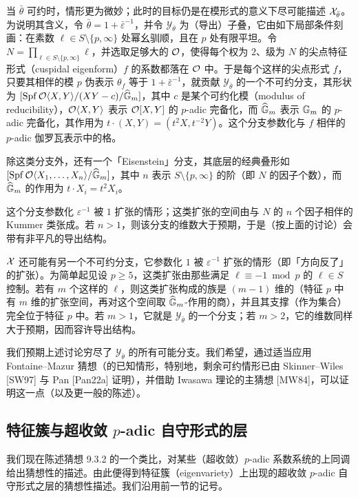 当 $\bar\theta$ 可约时，情形更为微妙；此时的目标仍是在模形式的意义下尽可能描述 $\mathcal{X}_{\bar\theta}$。为说明其含义，令 $\bar\theta=1+\bar\varepsilon^{-1}$，并令 $\mathcal Y_{\bar\theta}$ 为（导出）子叠，它由如下局部条件刻画：在素数 $\ell\in S\setminus\{p,\infty\}$ 处幂幺驯顺，且在 $p$ 处有限平坦。令 $N=\prod\limits_{\ell\in S\setminus\{p,\infty\}}\ell$，并选取足够大的 $\mathcal{O}$，使得每个权为 $2$、级为 $N$ 的尖点特征形式（cuspidal eigenform）$f$ 的系数都落在 $\mathcal{O}$ 中。于是每个这样的尖点形式 $f$，只要其相伴的模 $p$ 伪表示 $\theta_f$ 等于 $1+\bar\varepsilon^{-1}$，就贡献 $\mathcal Y_{\bar\theta}$ 的一个不可约分支，其形状为 $[\operatorname{Spf}\mathcal{O}\langle X,Y\rangle/(XY-c)/\widehat{\mathbb{G}}_m]$，其中 $c$ 是某个可约化模（modulus of reducibility），$\mathcal{O}\langle X,Y\rangle$ 表示 $\mathcal{O}[X,Y]$ 的 $p$-adic 完备化，而 $\widehat{\mathbb{G}}_m$ 表示 $\mathbb{G}_m$ 的 $p$-adic 完备化，其作用为 $t\cdot(X,Y)=(t^2X,t^{-2}Y)$。这个分支参数化与 $f$ 相伴的 $p$-adic 伽罗瓦表示中的格。

除这类分支外，还有一个「Eisenstein」分支，其底层的经典叠形如 $[\operatorname{Spf}\mathcal{O}\langle X_1,\dots,X_n\rangle/\widehat{\mathbb{G}}_m]$，其中 $n$ 表示 $S\setminus\{p,\infty\}$ 的阶（即 $N$ 的因子个数），而 $\widehat{\mathbb{G}}_m$ 的作用为 $t\cdot X_i=t^2X_i$。

这个分支参数化 $\varepsilon^{-1}$ 被 $1$ 扩张的情形；这类扩张的空间由与 $N$ 的 $n$ 个因子相伴的 Kummer 类张成。若 $n>1$，则该分支的维数大于预期，于是（按上面的讨论）会带有非平凡的导出结构。

$\mathcal{X}$ 还可能有另一个不可约分支，它参数化 $1$ 被 $\varepsilon^{-1}$ 扩张的情形（即「方向反了」的扩张）。为简单起见设 $p\ge5$，这类扩张由那些满足 $\ell\equiv-1\bmod p$ 的 $\ell\in S$ 控制。若有 $m$ 个这样的 $\ell$，则这类扩张构成的族是 $(m-1)$ 维的（特征 $p$ 中有 $m$ 维的扩张空间，再对这个空间取 $\widehat{\mathbb{G}}_m$-作用的商），并且其支撑（作为集合）完全位于特征 $p$ 中。若 $m>1$，它就是 $\mathcal Y_{\bar\theta}$ 的一个分支；若 $m>2$，它的维数同样大于预期，因而容许导出结构。

我们预期上述讨论穷尽了 $\mathcal Y_{\bar\theta}$ 的所有可能分支。我们希望，通过适当应用 Fontaine--Mazur 猜想（的已知情形，特别地，剩余可约情形已由 Skinner--Wiles [SW97] 与 Pan [Pan22a] 证明），并借助 Iwasawa 理论的主猜想 [MW84]，可以证明这一点（以及更一般的陈述）。

\subsection{特征簇与超收敛 $p$-adic 自守形式的层}

我们现在陈述猜想 9.3.2 的一个类比，对某些（超收敛）$p$-adic 系数系统的上同调给出猜想性的描述。由此便得到特征簇（eigenvariety）上出现的超收敛 $p$-adic 自守形式之层的猜想性描述。我们沿用前一节的记号。

